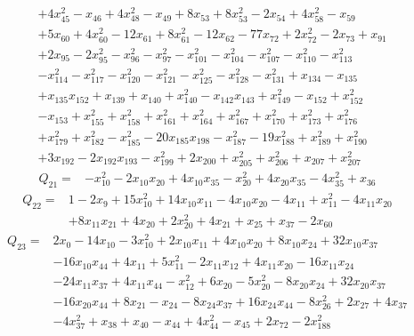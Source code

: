 \begin{equation*}
\begin{aligned}
& +4x_{45}^{2}-x_{46}+4x_{48}^{2}-x_{49}+8x_{53}+8x_{53}^{2}-2x_{54}+4x_{58}^{2}-x_{59}\\
& +5x_{60}+4x_{60}^{2}-12x_{61}+8x_{61}^{2}-12x_{62}-77x_{72}+2x_{72}^{2}-2x_{73}+x_{91}\\
& +2x_{95}-2x_{95}^{2}-x_{96}^{2}-x_{97}^{2}-x_{101}^{2}-x_{104}^{2}-x_{107}^{2}-x_{110}^{2}-x_{113}^{2}\\
& -x_{114}^{2}-x_{117}^{2}-x_{120}^{2}-x_{121}^{2}-x_{125}^{2}-x_{128}^{2}-x_{131}^{2}+x_{134}-x_{135}\\
& +x_{135}x_{152}+x_{139}+x_{140}+x_{140}^{2}-x_{142}x_{143}+x_{149}^{2}-x_{152}+x_{152}^{2}\\
& -x_{153}+x_{155}^{2}+x_{158}^{2}+x_{161}^{2}+x_{164}^{2}+x_{167}^{2}+x_{170}^{2}+x_{173}^{2}+x_{176}^{2}\\
& +x_{179}^{2}+x_{182}^{2}-x_{185}^{2}-20x_{185}x_{198}-x_{187}^{2}-19x_{188}^{2}+x_{189}^{2}+x_{190}^{2}\\
& +3x_{192}-2x_{192}x_{193}-x_{199}^{2}+2x_{200}+x_{205}^{2}+x_{206}^{2}+x_{207}+x_{207}^{2}
\end{aligned}\end{equation*}
\begin{equation*}\begin{aligned}
Q_{21}={}& -x_{10}^{2}-2x_{10}x_{20}+4x_{10}x_{35}-x_{20}^{2}+4x_{20}x_{35}-4x_{35}^{2}+x_{36}
\end{aligned}\end{equation*}
\begin{equation*}\begin{aligned}
Q_{22}={}& 1-2x_{9}+15x_{10}^{2}+14x_{10}x_{11}-4x_{10}x_{20}-4x_{11}+x_{11}^{2}-4x_{11}x_{20}\\
& +8x_{11}x_{21}+4x_{20}+2x_{20}^{2}+4x_{21}+x_{25}+x_{37}-2x_{60}
\end{aligned}\end{equation*}
\begin{equation*}\begin{aligned}
Q_{23}={}& 2x_{0}-14x_{10}-3x_{10}^{2}+2x_{10}x_{11}+4x_{10}x_{20}+8x_{10}x_{24}+32x_{10}x_{37}\\
& -16x_{10}x_{44}+4x_{11}+5x_{11}^{2}-2x_{11}x_{12}+4x_{11}x_{20}-16x_{11}x_{24}\\
& -24x_{11}x_{37}+4x_{11}x_{44}-x_{12}^{2}+6x_{20}-5x_{20}^{2}-8x_{20}x_{24}+32x_{20}x_{37}\\
& -16x_{20}x_{44}+8x_{21}-x_{24}-8x_{24}x_{37}+16x_{24}x_{44}-8x_{26}^{2}+2x_{27}+4x_{37}\\
& -4x_{37}^{2}+x_{38}+x_{40}-x_{44}+4x_{44}^{2}-x_{45}+2x_{72}-2x_{188}^{2}
\end{aligned}\end{equation*}
